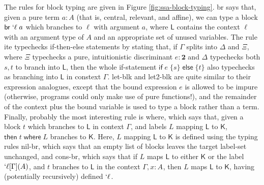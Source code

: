 \documentclass[acmsmall,screen,review]{acmart}
\newcommand{\mb}[1]{\ensuremath{\mathbf{#1}}}
\newcommand{\ms}[1]{\ensuremath{\mathsf{#1}}}
\newcommand{\lbl}[1]{{`#1}}
\newcommand{\brb}[2]{\ms{br}\;#1\;#2}
\newcommand{\lbrb}[2]{\brb{\lbl{#1}}{#2}}
\newcommand{\ite}[3]{\ms{if}\;#1\;\{#2\}\;\ms{else}\;\{#3\}}
\newcommand{\ewhere}[2]{\ms{then}\;#1\;\ms{where}\;#2}
\newcommand{\thyp}[3]{#1: {#2}^{#3}}
\newcommand{\rle}[1]{{\scriptsize\textsf{#1}}}
\begin{document}
The rules for block typing are given in Figure \ref{fig:ssa-block-typing}.
\rle{br} says that, given a pure term \(a: A\) (that is, central, relevant, and
affine), we can type a block \(\lbrb{\ell}{a}\) which branches to \(\ell\) with
argument \(a\), where \(\ms{L}\) contains the context \(\ell\) with an argument
type of \(A\) and an appropriate set of unused variables. The rule \rle{ite}
typechecks if-then-else statements by stating that, if \(\Gamma\) splits into
\(\Delta\) and \(\Xi\), where \(\Xi\) typechecks a pure, intuitionistic
discriminant \(e: \mb{2}\) and \(\Delta\) typechecks both \(s, t\) to branch
into \(\ms{L}\), then the whole if-statement \(\ite{e}{s}{t}\) also typechecks
as branching into \(\ms{L}\) in constext \(\Gamma\). \rle{let-blk} and
\rle{let2-blk} are quite similar to their expression analogues, except that the
bound expression \(e\) is allowed to be impure (otherwise, programs could only
make use of pure functions!), and the remainder of the context plus the bound
variable is used to type a block rather than a term. Finally, probably the most
interesting rule is \rle{where}, which says that, given a block \(t\) which
branches to \(\ms{L}\) in context \(\Gamma\), and labels \(L\) mapping
\(\ms{L}\) to \(\ms{K}\), \(\ewhere{t}{L}\) branches to \(\ms{K}\). Here, \(L\)
mapping \(\ms{L}\) to \(\ms{K}\) is defined using the typing rules \rle{nil-br},
which says that an empty list of blocks leaves the target label-set unchanged,
and \rle{cons-br}, which says that if \(L\) maps \(\ms{L}\) to either \(\ms{K}\)
or the label \(\lbl{\ell}[\Gamma](A)\), and \(t\) branches to \(\ms{L}\) in the
context \(\Gamma, \thyp{x}{A}{}\), then \(L\) maps \(\ms{L}\) to \(\ms{K}\),
having (potentially recursively) defined \(\lbl{\ell}\).
\end{document}
